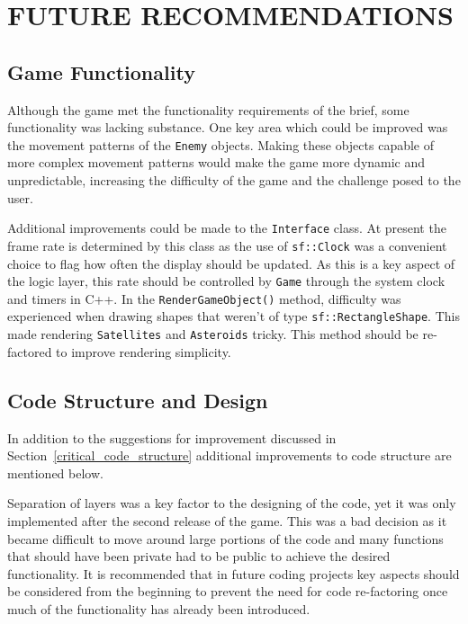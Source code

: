 \documentclass[10pt,twocolumn]{witseiepaper}
\begin{document}
\section{FUTURE RECOMMENDATIONS}

\subsection{Game Functionality}

Although the game met the functionality requirements of the brief, some functionality was lacking substance. One key area which could be improved was the movement patterns of the \texttt{Enemy} objects. Making these objects capable of more complex movement patterns would make the game more dynamic and unpredictable, increasing the difficulty of the game and the challenge posed to the user.


Additional improvements could be made to the \texttt{Interface} class. At present the frame rate is determined by this class as the use of \texttt{sf::Clock} was a convenient choice to flag how often the display should be updated. As this is a key aspect of the logic layer, this rate should be controlled by \texttt{Game} through the system clock and timers in C++. In the \texttt{RenderGameObject()} method, difficulty was experienced when drawing shapes that weren't of type \texttt{sf::RectangleShape}. This made rendering \texttt{Satellites} and \texttt{Asteroids} tricky. This method should be re-factored to improve rendering simplicity.

\subsection{Code Structure and Design}\label{code_improvements}

In addition to the suggestions for improvement discussed in Section~\ref{critical_code_structure} additional improvements to code structure are mentioned below.

Separation of layers was a key factor to the designing of the code, yet it was only implemented after the second release of the game. This was a bad decision as it became difficult to move around large portions of the code and many functions that should have been private had to be public to achieve the desired functionality. It is recommended that in future coding projects key aspects should be considered from the beginning to prevent the need for code re-factoring once much of the functionality has already been introduced.
\end{document}
